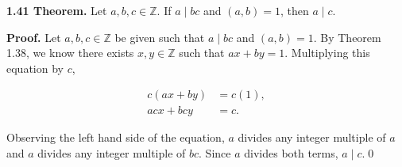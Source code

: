 \documentclass[12pt]{article}
\begin{document}
\noindent\textbf{1.41 Theorem.} Let $a,b,c\in\mathbb{Z}$. If $a\mid bc$ and $(a,b)=1$, then $a\mid c$.

\bigskip

\noindent\textbf{Proof.} Let $a,b,c\in\mathbb{Z}$ be given such that $a\mid bc$ and $(a,b)=1$. By Theorem 1.38, we know there exists $x,y\in\mathbb{Z}$ such that $ax+by=1$. Multiplying this equation by $c$,

\begin{align*}
c(ax+by) &= c(1), \\
acx + bcy &= c.
\end{align*}

\noindent Observing the left hand side of the equation, $a$ divides any integer multiple of $a$ and $a$ divides any integer multiple of $bc$. Since $a$ divides both terms, $a\mid c$.\qed
\end{document}
